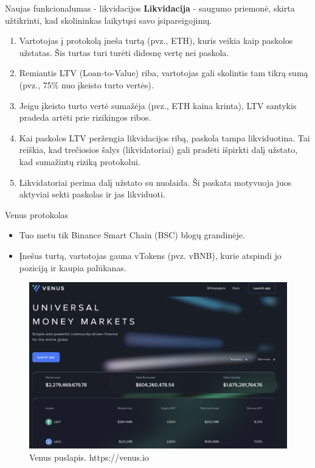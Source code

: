 \documentclass[12pt]{beamer}
\begin{document}
\begin{frame}{Naujas funkcionalumas - likvidacijos}
  \textbf{Likvidacija} - saugumo priemonė, skirta užtikrinti, kad skolininkas laikytųsi savo įsipareigojimų.
  \begin{enumerate}
    \item Vartotojas į protokolą įneša turtą (pvz., ETH), kuris veikia kaip paskolos užstatas. Šis turtas turi turėti didesnę vertę nei paskola.
    \item Remiantis LTV (Loan-to-Value) riba, vartotojas gali skolintis tam tikrą sumą (pvz., 75\% nuo įkeisto turto vertės).
    \item Jeigu įkeisto turto vertė sumažėja (pvz., ETH kaina krinta), LTV santykis pradeda artėti prie rizikingos ribos.
    \item Kai paskolos LTV peržengia likvidacijos ribą, paskola tampa likviduotina. Tai reiškia, kad trečiosios šalys (likvidatoriai) gali pradėti išpirkti dalį užstato, kad sumažintų riziką protokolui.
    \item Likvidatoriai perima dalį užstato su nuolaida. Ši paskata motyvuoja juos aktyviai sekti paskolas ir jas likviduoti.
  \end{enumerate}
\end{frame}

\begin{frame}{Venus protokolas}
  \begin{itemize}
    \item Tuo metu tik Binance Smart Chain (BSC) blogų grandinėje.
    \item Įnešus turtą, vartotojas gauna vTokens (pvz. vBNB), kurie atspindi jo poziciją ir kaupia palūkanas.
  \end{itemize}

  \begin{figure}[H]
    \centering
    \includegraphics[scale=0.19]{resources/venus.png}
    \caption{Venus puslapis. https://venus.io}
    \label{img:venus}
  \end{figure}
\end{frame}
\end{document}
